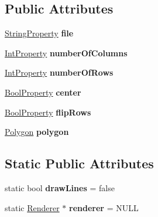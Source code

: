 \subsection*{Public Attributes}
\begin{DoxyCompactItemize}
\item 
\hypertarget{classg2c_1_1_sprite_a16c5ad30837942d0687d54a04953bc94}{
\hyperlink{classg2c_1_1_string_property}{StringProperty} {\bfseries file}}
\label{classg2c_1_1_sprite_a16c5ad30837942d0687d54a04953bc94}

\item 
\hypertarget{classg2c_1_1_sprite_a950069d33a7ae543f31a596569c0a839}{
\hyperlink{classg2c_1_1_int_property}{IntProperty} {\bfseries numberOfColumns}}
\label{classg2c_1_1_sprite_a950069d33a7ae543f31a596569c0a839}

\item 
\hypertarget{classg2c_1_1_sprite_a2eea2ddb6eff64c44d4d86567103e046}{
\hyperlink{classg2c_1_1_int_property}{IntProperty} {\bfseries numberOfRows}}
\label{classg2c_1_1_sprite_a2eea2ddb6eff64c44d4d86567103e046}

\item 
\hypertarget{classg2c_1_1_sprite_a5ecdb4a09f9abbc0ca6db3c90472ae72}{
\hyperlink{classg2c_1_1_bool_property}{BoolProperty} {\bfseries center}}
\label{classg2c_1_1_sprite_a5ecdb4a09f9abbc0ca6db3c90472ae72}

\item 
\hypertarget{classg2c_1_1_sprite_a16e246843e6eab65e442dac687534780}{
\hyperlink{classg2c_1_1_bool_property}{BoolProperty} {\bfseries flipRows}}
\label{classg2c_1_1_sprite_a16e246843e6eab65e442dac687534780}

\item 
\hypertarget{classg2c_1_1_sprite_ad46d6a4c78d395f282c97e988ef51ac3}{
\hyperlink{classg2c_1_1_polygon}{Polygon} {\bfseries polygon}}
\label{classg2c_1_1_sprite_ad46d6a4c78d395f282c97e988ef51ac3}

\end{DoxyCompactItemize}
\subsection*{Static Public Attributes}
\begin{DoxyCompactItemize}
\item 
\hypertarget{classg2c_1_1_sprite_a6c1f9f057d8e505ca6f66a71343ff6a9}{
static bool {\bfseries drawLines} = false}
\label{classg2c_1_1_sprite_a6c1f9f057d8e505ca6f66a71343ff6a9}

\item 
\hypertarget{classg2c_1_1_sprite_abf2fcf0bb64c335b0a41f21fe82b5e05}{
static \hyperlink{classg2c_1_1_renderer}{Renderer} $\ast$ {\bfseries renderer} = NULL}
\label{classg2c_1_1_sprite_abf2fcf0bb64c335b0a41f21fe82b5e05}

\end{DoxyCompactItemize}
